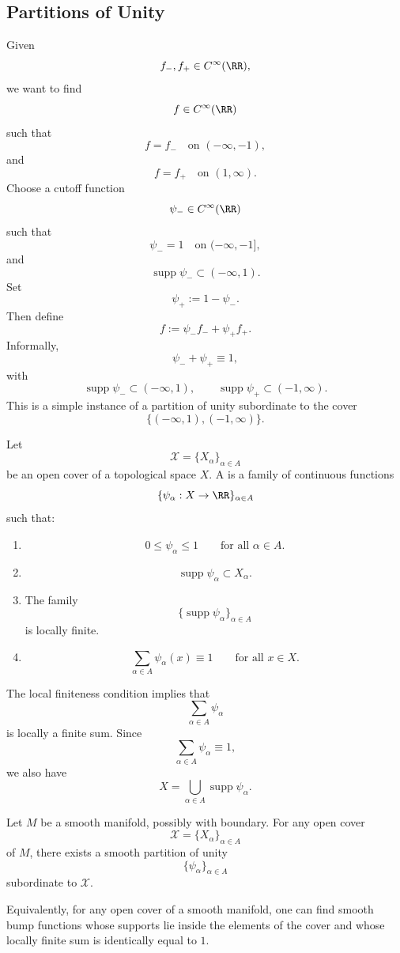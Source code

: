 \subsection{Partitions of Unity}

\begin{example}
Given
\[
  f_-,f_+\in C^\infty(\RR),
\]
we want to find
\[
  f\in C^\infty(\RR)
\]
such that
\[
  f=f_-
  \quad\text{on }(-\infty,-1),
\]
and
\[
  f=f_+
  \quad\text{on }(1,\infty).
\]
Choose a cutoff function
\[
  \psi_-\in C^\infty(\RR)
\]
such that
\[
  \psi_-=1
  \quad\text{on }(-\infty,-1],
\]
and
\[
  \operatorname{supp}\psi_-\subset (-\infty,1).
\]
Set
\[
  \psi_+:=1-\psi_-.
\]
Then define
\[
  f:=\psi_-f_-+\psi_+f_+.
\]
Informally,
\[
  \psi_-+\psi_+\equiv 1,
\]
with
\[
  \operatorname{supp}\psi_-\subset (-\infty,1),
  \qquad
  \operatorname{supp}\psi_+\subset (-1,\infty).
\]
This is a simple instance of a partition of unity subordinate to the cover
\[
  \{(-\infty,1),(-1,\infty)\}.
\]
\end{example}

\begin{definition}
Let
\[
  \mathcal X=\{X_\alpha\}_{\alpha\in A}
\]
be an open cover of a topological space $X$. A 
is a family of continuous functions
\[
  \{\psi_\alpha:X\to \RR\}_{\alpha\in A}
\]
such that:
\begin{enumerate}
  \item
  \[
    0\le \psi_\alpha\le 1
    \qquad\text{for all }\alpha\in A.
  \]

  \item
  \[
    \operatorname{supp}\psi_\alpha\subset X_\alpha.
  \]

  \item The family
  \[
    \{\operatorname{supp}\psi_\alpha\}_{\alpha\in A}
  \]
  is locally finite.

  \item
  \[
    \sum_{\alpha\in A}\psi_\alpha(x)\equiv 1
    \qquad\text{for all }x\in X.
  \]
\end{enumerate}
\end{definition}

\begin{remark}
The local finiteness condition implies that
\[
  \sum_{\alpha\in A}\psi_\alpha
\]
is locally a finite sum. Since
\[
  \sum_{\alpha\in A}\psi_\alpha\equiv 1,
\]
we also have
\[
  X=\bigcup_{\alpha\in A}\operatorname{supp}\psi_\alpha.
\]
\end{remark}

\begin{theorem}
Let $M$ be a smooth manifold, possibly with boundary. For any open cover
\[
  \mathcal X=\{X_\alpha\}_{\alpha\in A}
\]
of $M$, there exists a smooth partition of unity
\[
  \{\psi_\alpha\}_{\alpha\in A}
\]
subordinate to $\mathcal X$.
\end{theorem}

\begin{remark}
Equivalently, for any open cover of a smooth manifold, one can find smooth bump functions whose supports lie inside the elements of the cover and whose locally finite sum is identically equal to $1$.
\end{remark}
